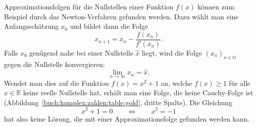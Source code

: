 Approximationsfolgen für die Nullstellen einer Funktion $f(x)$ können
zum Beispiel durch das Newton-Verfahren gefunden werden.
%
%
Dazu wählt man eine Anfangsschätzung $x_0$ und bildet dann die 
Folge
\[
x_{n+1}
=
x_n - \frac{f(x_n)}{f'(x_n)}.
\]
Falls $x_0$ genügend nahe bei einer Nullstelle $\hat{x}$ liegt, wird die
Folge $(x_n)_{n\in\mathbb{N}}$ gegen die Nullstelle konvergieren:
\[
\lim_{n\to\infty} x_n
=
\hat{x}.
\]
Wendet man dies auf die Funktion $f(x)=x^2+1$ an, welche $f(x) \ge 1$
für alle $x\in\mathbb{R}$ keine reelle Nullstelle hat, erhält man eine
Folge, die keine Cauchy-Folge ist
(Abbildung~\ref{buch:komplex:zahlen:table:gold}, dritte Spalte).
Die Gleichung
\begin{equation}
x^2 + 1 = 0
\qquad\Leftrightarrow\qquad
x^2 = -1
\end{equation}
hat also keine Lösung, die mit einer Approximationsfolge gefunden werden
kann.

